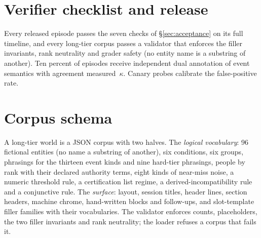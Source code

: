 \documentclass{article} %
\newcommand{\ph}[1]{#1}
\newcommand{\ph}[1]{\colorbox{phbg}{\textcolor{phfg}{\small\texttt{#1}}}}
\begin{document}
\section{Verifier checklist and release}
Every released episode passes the seven checks of \S\ref{sec:acceptance} on its full timeline, and every long-tier corpus passes a validator that enforces the filler invariants, rank neutrality and grader safety (no entity name is a substring of another). Ten percent of episodes receive independent dual annotation of event semantics with agreement measured~\ph{$\kappa$}. Canary probes calibrate the false-positive rate.

\section{Corpus schema}
A long-tier world is a JSON corpus with two halves. The \emph{logical vocabulary}: 96 fictional entities (no name a substring of another), six conditions, six groups, phrasings for the thirteen event kinds and nine hard-tier phrasings, people by rank with their declared authority terms, eight kinds of near-miss noise, a numeric threshold rule, a certification list regime, a derived-incompatibility rule and a conjunctive rule. The \emph{surface}: layout, session titles, header lines, section headers, machine chrome, hand-written blocks and follow-ups, and slot-template filler families with their vocabularies. The validator enforces counts, placeholders, the two filler invariants and rank neutrality; the loader refuses a corpus that fails it.
\end{document}

